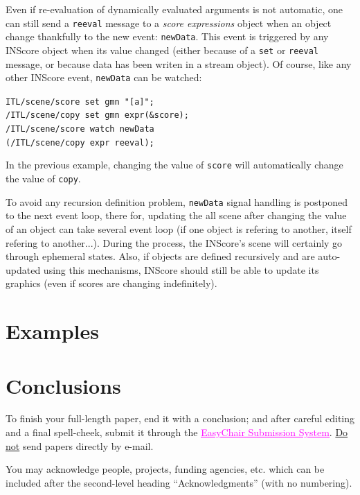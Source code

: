 \documentclass{article}
\newenvironment{ExprCode}		{\vspace{-2mm} \small\verbatim}{\endverbatim\vspace{-2mm}}
\newcommand{\OSC}[1]{\texttt{#1}}
\newcommand{\sExpr}{\emph{score expressions} }
\newcommand{\sample}	[1]			{\vspace{-1.8em}\begin{center}\colorbox{mygrey}{\begin{minipage}[t]{1\columnwidth} {\small \texttt{#1}}\end{minipage}}\end{center}}
\begin{document}
Even if re-evaluation of dynamically evaluated arguments is not automatic, one can still send a \OSC{reeval} message to a \sExpr object when an object change thankfully to the new event: \OSC{newData}.
This event is triggered by any INScore object when its value changed (either because of a \OSC{set} or \OSC{reeval} message, or because data has been writen in a stream object). Of course, like any other INScore event, \OSC{newData} can be watched:
\sample{ITL/scene/score set gmn "[a]";\\
/ITL/scene/copy set gmn expr(\&score);\\
/ITL/scene/score watch newData\\   
\hspace*{8mm}(/ITL/scene/copy expr reeval);
}
In the previous example, changing the value of \OSC{score} will automatically change the value of \OSC{copy}.

To avoid any recursion definition problem, \OSC{newData} signal handling is postponed to the next event loop, there for, updating the all scene after changing the value of an object can take several event loop (if one object is refering to another, itself refering to another...). During the process, the INScore's scene will certainly go through ephemeral states. Also, if objects are defined recursively and are auto-updated using this mechanisms, INScore should still be able to update its graphics (even if scores are changing indefinitely).

\section{Examples}

\section{Conclusions}
To finish your full-length paper, end it with a conclusion;
and after careful editing and a final spell-cheek,
submit it through the \href{https://easychair.org/conferences/?conf=tenor2016}{\textcolor {magenta} {\underline {EasyChair Submission System}}}. 
\underline{Do not} send papers directly by e-mail.
%
\begin{acknowledgments}
You may acknowledge people, projects, 
funding agencies, etc. 
which can be included after the second-level heading
``Acknowledgments'' (with no numbering).
\end{acknowledgments} 



%               
%      
\end{document}
